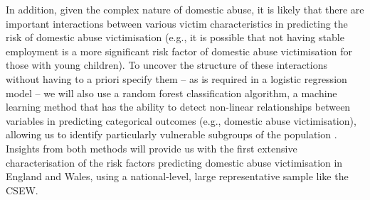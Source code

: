 \documentclass[11pt, a4paper]{article}
\newcommand{\TM}[1] {{\textcolor{orange}{#1}}}
\begin{document}
In addition, given the complex nature of domestic abuse, it is likely that there are important interactions between various victim characteristics in predicting the risk of domestic abuse victimisation (e.g., it is possible that not having stable employment is a more significant risk factor of domestic abuse victimisation for those with young children). To uncover the structure of these interactions without having to a priori specify them -- as is required in a logistic regression model -- we will also use a random forest classification algorithm, a machine learning method that has the ability to detect non-linear relationships between variables in predicting categorical outcomes (e.g., domestic abuse victimisation), allowing us to identify particularly vulnerable subgroups of the population \cite{rforest}. Insights from both methods will provide us with the first extensive characterisation of the risk factors predicting domestic abuse victimisation in England and Wales, using a national-level, large representative sample like the CSEW.






\end{document}
